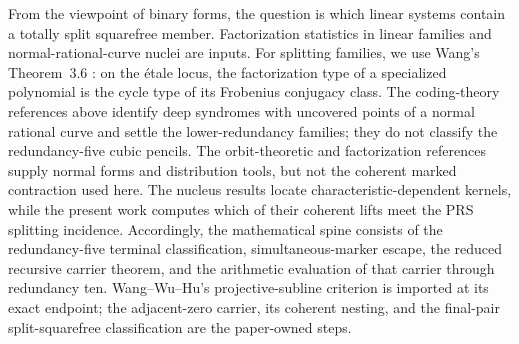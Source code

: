 From the viewpoint of binary forms, the question is which linear
systems contain a totally split squarefree member.  Factorization
statistics in linear families \cite{CMP2017} and
normal-rational-curve nuclei
\cite[Lem.~1 and Thm.~1]{GmainerHavlicek2013} are inputs.
For splitting families, we use Wang's Theorem~3.6
\cite{Wang2026}: on the \'etale locus, the factorization type of a
specialized polynomial is the cycle type of its Frobenius conjugacy
class.  The coding-theory references above
identify deep syndromes with uncovered points of a
normal rational curve and settle the lower-redundancy families; they do
not classify the redundancy-five cubic pencils.  The orbit-theoretic
and factorization references supply normal forms and distribution
tools, but not the coherent marked contraction used here.  The nucleus
results locate characteristic-dependent kernels, while the present
work computes which of their coherent lifts meet the PRS splitting
incidence.  Accordingly, the mathematical spine consists of the
redundancy-five terminal classification, simultaneous-marker escape,
the reduced recursive carrier theorem, and the arithmetic evaluation of
that carrier through redundancy ten.  Wang--Wu--Hu's projective-subline
criterion is imported at its exact endpoint; the adjacent-zero carrier, its
coherent nesting, and the final-pair split-squarefree classification are the
paper-owned steps.
